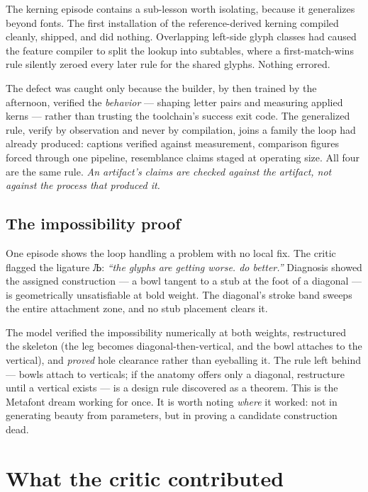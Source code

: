 \documentclass[12pt]{article}
\newcommand{\cz}[1]{{\chu #1}}
\begin{document}
The kerning episode contains a sub-lesson worth isolating, because it generalizes beyond fonts. The first installation of the reference-derived kerning compiled cleanly, shipped, and did nothing. Overlapping left-side glyph classes had caused the feature compiler to split the lookup into subtables, where a first-match-wins rule silently zeroed every later rule for the shared glyphs. Nothing errored.

The defect was caught only because the builder, by then trained by the afternoon, verified the \emph{behavior} — shaping letter pairs and measuring applied kerns — rather than trusting the toolchain's success exit code. The generalized rule, verify by observation and never by compilation, joins a family the loop had already produced: captions verified against measurement, comparison figures forced through one pipeline, resemblance claims staged at operating size. All four are the same rule. \emph{An artifact's claims are checked against the artifact, not against the process that produced it.}

\subsection{The impossibility proof}

One episode shows the loop handling a problem with no local fix. The critic flagged the ligature \cz{Љ}: \emph{``the glyphs are getting worse. do better.''} Diagnosis showed the assigned construction — a bowl tangent to a stub at the foot of a diagonal — is geometrically unsatisfiable at bold weight. The diagonal's stroke band sweeps the entire attachment zone, and no stub placement clears it.

The model verified the impossibility numerically at both weights, restructured the skeleton (the leg becomes diagonal-then-vertical, and the bowl attaches to the vertical), and \emph{proved} hole clearance rather than eyeballing it. The rule left behind — bowls attach to verticals; if the anatomy offers only a diagonal, restructure until a vertical exists — is a design rule discovered as a theorem. This is the Metafont dream working for once. It is worth noting \emph{where} it worked: not in generating beauty from parameters, but in proving a candidate construction dead.

\section{What the critic contributed}\label{sec:critic}
\end{document}
